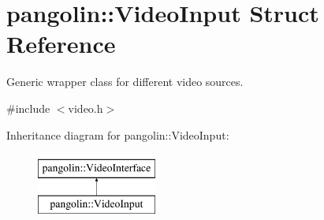\hypertarget{structpangolin_1_1_video_input}{}\section{pangolin\+:\+:Video\+Input Struct Reference}
\label{structpangolin_1_1_video_input}


Generic wrapper class for different video sources.  




{\ttfamily \#include $<$video.\+h$>$}

Inheritance diagram for pangolin\+:\+:Video\+Input\+:\begin{figure}[H]
\begin{center}
\leavevmode
\includegraphics[height=2.000000cm]{structpangolin_1_1_video_input}
\end{center}
\end{figure}

